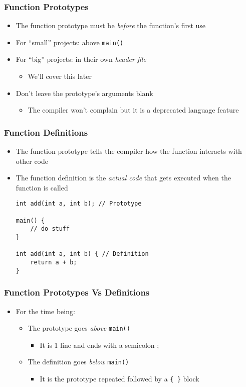 \documentclass[14pt]{beamer}
\begin{document}
\begin{frame}
\frametitle{Function Prototypes}
\begin{itemize}
\item The function prototype must be \textit{before} the function's first use
\item For ``small'' projects: above \texttt{main()}
\item For ``big'' projects: in their own \textit{header file}
	\begin{itemize}
		\item We'll cover this later
	\end{itemize}
\item Don't leave the prototype's arguments blank
	\begin{itemize}
		\item The compiler won't complain but it is a deprecated language feature
	\end{itemize}
\end{itemize}
\end{frame}

\begin{frame}[fragile]
\frametitle{Function Definitions}
\begin{itemize}
\item The function prototype tells the compiler how the function interacts with other code
\item The function definition is the \textit{actual code} that gets executed when the function is called
\begin{lstlisting}[style=CStyle]
int add(int a, int b); // Prototype

main() {
	// do stuff
}

int add(int a, int b) { // Definition
	return a + b;
}
\end{lstlisting}
\end{itemize}
\end{frame}

\begin{frame}
\frametitle{Function Prototypes Vs Definitions}
\begin{itemize}
\item For the time being:
\begin{itemize}
	\item The prototype goes \textit{above} \texttt{main()}
		\begin{itemize}
			\item It is 1 line and ends with a semicolon ;
		\end{itemize}
	\item The definition goes \textit{below} \texttt{main()}
		\begin{itemize}
			\item It is the prototype repeated followed by a \texttt{\{ \}} block
		\end{itemize}
\end{itemize}
\end{itemize}
\end{frame}
\end{document}
